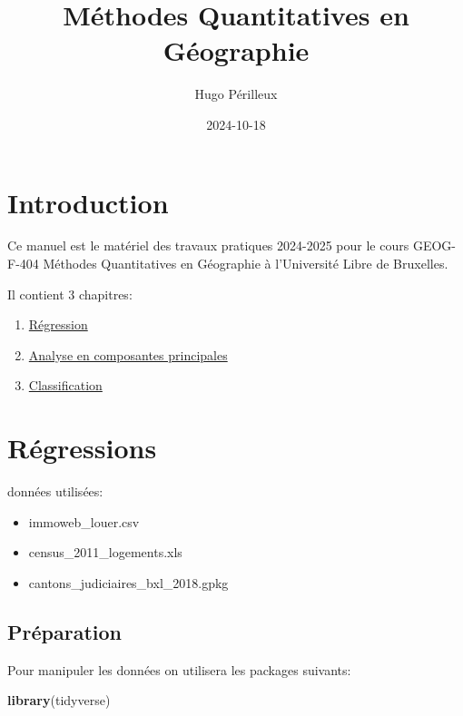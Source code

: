 \documentclass[
]{book}
\title{Méthodes Quantitatives en Géographie}
\author{Hugo Périlleux}
\date{2024-10-18}
\newenvironment{Shaded}{\begin{snugshade}}{\end{snugshade}}
\newcommand{\FunctionTok}[1]{\textcolor[rgb]{0.13,0.29,0.53}{\textbf{#1}}}
\newcommand{\NormalTok}[1]{#1}
\begin{document}
\maketitle

{
\setcounter{tocdepth}{1}
\tableofcontents
}
\hypertarget{introduction}{%
\chapter*{Introduction}\label{introduction}}

Ce manuel est le matériel des travaux pratiques 2024-2025 pour le cours GEOG-F-404 Méthodes Quantitatives en Géographie à l'Université Libre de Bruxelles.

Il contient 3 chapitres:

\begin{enumerate}
\def\labelenumi{\arabic{enumi}.}
\item
  \href{https://bookdown.org/hugoperilleux/manuel_geo_quanti/r\%C3\%A9gressions.html}{Régression}
\item
  \href{https://bookdown.org/hugoperilleux/manuel_geo_quanti/analyse-en-composantes-principales.html}{Analyse en composantes principales}
\item
  \href{https://bookdown.org/hugoperilleux/manuel_geo_quanti/classification.html}{Classification}
\end{enumerate}

\hypertarget{ruxe9gressions}{%
\chapter{Régressions}\label{ruxe9gressions}}

données utilisées:

\begin{itemize}
\item
  immoweb\_louer.csv
\item
  census\_2011\_logements.xls
\item
  cantons\_judiciaires\_bxl\_2018.gpkg
\end{itemize}

\hypertarget{pruxe9paration}{%
\section{Préparation}\label{pruxe9paration}}

Pour manipuler les données on utilisera les packages suivants:

\begin{Shaded}
\begin{Highlighting}[]
\FunctionTok{library}\NormalTok{(tidyverse)}
\end{Highlighting}
\end{Shaded}
\end{document}
